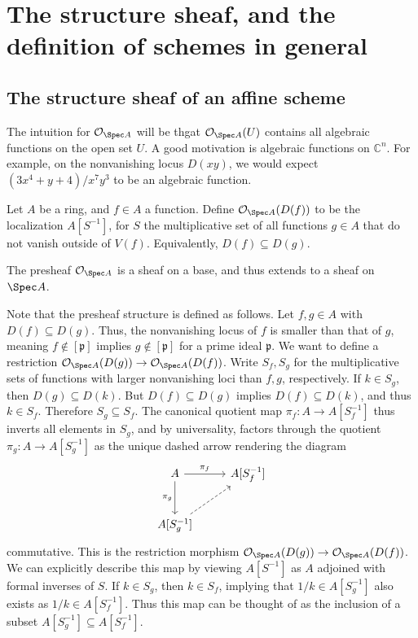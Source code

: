 \chapter{The structure sheaf, and the definition of schemes in general}

\section{The structure sheaf of an affine scheme}

The intuition for $\mathcal{O} _{\Spec A} $ will be thgat $\mathcal{O} _{\Spec A} (U)$ contains all algebraic functions on the open set $U$. A good motivation is algebraic functions on $\mathbb{C} ^n$. For example, on the nonvanishing locus $D(xy)$, we would expect $(3x^4 + y + 4) / x^7y^3$ to be an algebraic function. 

\begin{definition}\label{dfn:4-1-1}
	Let $A$ be a ring, and $f\in A$ a function. Define $\mathcal{O} _{\Spec A} (D(f))$ to be the localization $A[S^{-1} ]$, for $S$ the multiplicative set of all functions $g\in A$ that do not vanish outside of $V(f)$. Equivalently, $D(f) \subseteq D(g)$.
\end{definition}

\begin{theorem}\label{thm:4-1-2}
	The presheaf $\mathcal{O} _{\Spec A} $ is a sheaf on a base, and thus extends to a sheaf on $\Spec A$.
\end{theorem}

Note that the presheaf structure is defined as follows. Let $f,g\in A$ with $D(f) \subseteq D(g)$. Thus, the nonvanishing locus of $f$ is smaller than that of $g$, meaning $f\notin [\mathfrak{p} ]$ implies $g\notin [\mathfrak{p} ]$ for a prime ideal $\mathfrak{p} $. We want to define a restriction $\mathcal{O} _{\Spec A} (D(g))\to \mathcal{O} _{\Spec A} (D(f))$. Write $S_f,S_g$ for the multiplicative sets of functions with larger nonvanishing loci than $f,g$, respectively. If $k\in S_g$, then $D(g) \subseteq D(k)$. But $D(f)\subseteq D(g)$ implies $D(f)\subseteq D(k)$, and thus $k\in S_f$. Therefore $S_g \subseteq S_f$. The canonical quotient map $\pi _f : A \to A[S^{-1}_f]$ thus inverts all elements in $S_g$, and by universality, factors through the quotient $\pi _g : A \to A[S_g^{-1} ]$ as the unique dashed arrow rendering the diagram
\[\begin{tikzcd}[row sep = 2.5em, column sep = 2.5em]
	A \ar[" \pi _f ", r] \ar[" \pi _g "', d]  & {A[S_{f} ^{-1} ]} \\
	{A[S_g^{-1} ]} \ar[dashed, ur]  & 
\end{tikzcd}\]
commutative. This is the restriction morphism $\mathcal{O} _{\Spec A} (D(g))\to \mathcal{O} _{\Spec A} (D(f))$. We can explicitly describe this map by viewing $A[S^{-1} ]$ as $A$ adjoined with formal inverses of $S$. If $k\in S_g$, then $k\in S_f$, implying that $1/k \in A[S^{-1}_g]$ also exists as $1/k\in A[S^{-1} _f]$. Thus this map can be thought of as the inclusion of a subset $A[S_g^{-1} ]\subseteq A[S_f^{-1} ]$.



